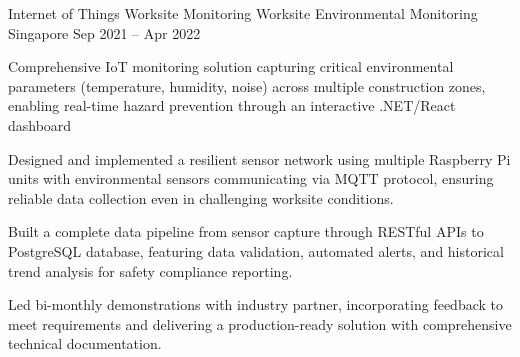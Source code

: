 \begin{cventries}
    \cventry
    {Internet of Things Worksite Monitoring} %
    {Worksite Environmental Monitoring} %
    {Singapore} %
    {Sep 2021 – Apr 2022} %
    {
        \begin{cvitems} %
            \item {Comprehensive IoT monitoring solution capturing critical environmental parameters (temperature, humidity, noise) across multiple construction zones, enabling real-time hazard prevention through an interactive .NET/React dashboard}
            \item {Designed and implemented a resilient sensor network using multiple Raspberry Pi units with environmental sensors communicating via MQTT protocol, ensuring reliable data collection even in challenging worksite conditions.}
            \item {Built a complete data pipeline from sensor capture through RESTful APIs to PostgreSQL database, featuring data validation, automated alerts, and historical trend analysis for safety compliance reporting.}
            \item {Led bi-monthly demonstrations with industry partner, incorporating feedback to meet requirements and delivering a production-ready solution with comprehensive technical documentation.}
            \vspace{5mm}
        \end{cvitems}
    }

\end{cventries}
